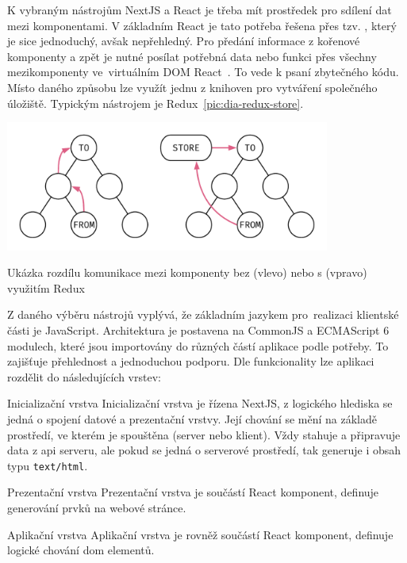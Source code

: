 K vybraným nástrojům NextJS a React je třeba mít prostředek pro sdílení dat mezi komponentami. V základním React je tato potřeba řešena přes tzv. , který je sice jednoduchý, avšak nepřehledný. Pro předání informace z kořenové komponenty a zpět je nutné posílat potřebná data nebo funkci přes všechny mezikomponenty ve~virtuálním DOM React~\cite{reactLifting}. To vede k psaní zbytečného kódu. Místo daného způsobu lze využít jednu z knihoven pro vytváření společného úložiště. Typickým nástrojem je Redux~\ref{pic:dia-redux-store}.

\begin{fig:illustration}
   \includegraphics[width=0.8\textwidth]{images/dia-redux-store.pdf}
   \caption{Ukázka rozdílu komunikace mezi komponenty bez (vlevo) nebo s (vpravo) využitím Redux}\label{pic:dia-redux-store}
\end{fig:illustration}


Z daného výběru nástrojů vyplývá, že základním jazykem pro~realizaci klientské části je JavaScript. Architektura je postavena na CommonJS a ECMAScript 6 modulech, které jsou importovány do různých částí aplikace podle potřeby. To zajišťuje přehlednost a jednoduchou podporu. Dle funkcionality lze aplikaci rozdělit do následujících vrstev:

\begin{dl}
   \item [Inicializační vrstva] Inicializační vrstva je řízena NextJS, z logického hlediska se jedná o spojení datové a prezentační vrstvy. Její chování se mění na základě prostředí, ve kterém je spouštěna (server nebo klient). Vždy stahuje a připravuje data z \gls{api} serveru, ale pokud se jedná o serverové prostředí, tak generuje i obsah typu \texttt{text/html}.
   
   \item [Prezentační vrstva] Prezentační vrstva je součástí React komponent, definuje generování prvků na webové stránce. 
   
   \item [Aplikační vrstva] Aplikační vrstva je rovněž součástí React komponent, definuje logické chování \gls{dom} elementů.
\end{dl}


